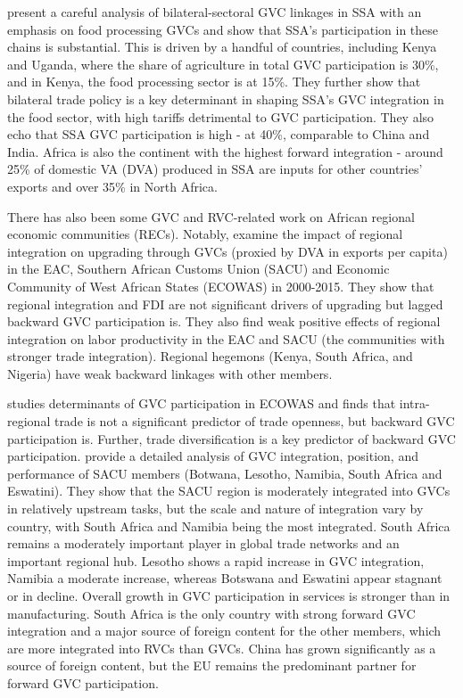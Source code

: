 \documentclass[a4paper]{article}
\begin{document}
\citet{balie2019does} present a careful analysis of bilateral-sectoral GVC linkages in SSA with an emphasis on food processing GVCs and show that SSA's participation in these chains is substantial. This is driven by a handful of countries, including Kenya and Uganda, where the share of agriculture in total GVC participation is 30\%, and in Kenya, the food processing sector is at 15\%. They further show that bilateral trade policy is a key determinant in shaping SSA's GVC integration in the food sector, with high tariffs detrimental to GVC participation. They also echo \citet{foster2015global} that SSA GVC participation is high - at 40\%, comparable to China and India. Africa is also the continent with the highest forward integration - around 25\% of domestic VA (DVA) produced in SSA are inputs for other countries' exports and over 35\% in North Africa. \newline

There has also been some GVC and RVC-related work on African regional economic communities (RECs). Notably, \citet{obasaju2021regional} examine the impact of regional integration on upgrading through GVCs (proxied by DVA in exports per capita) in the EAC, Southern African Customs Union (SACU) and Economic Community of West African States (ECOWAS) in 2000-2015. They show that regional integration and FDI are not significant drivers of upgrading but lagged backward GVC participation is. They also find weak positive effects of regional integration on labor productivity in the EAC and SACU (the communities with stronger trade integration). Regional hegemons (Kenya, South Africa, and Nigeria) have weak backward linkages with other members. \newline 

\citet{tinta2017determinants} studies determinants of GVC participation in ECOWAS and finds that intra-regional trade is not a significant predictor of trade openness, but backward GVC participation is. Further, trade diversification is a key predictor of backward GVC participation. \citet{engel2016sacu} provide a detailed analysis of GVC integration, position, and performance of SACU members (Botwana, Lesotho, Namibia, South Africa and Eswatini). They show that the SACU region is moderately integrated into GVCs in relatively upstream tasks, but the scale and nature of integration vary by country, with South Africa and Namibia being the most integrated. South Africa remains a moderately important player in global trade networks and an important regional hub. Lesotho shows a rapid increase in GVC integration, Namibia a moderate increase, whereas Botswana and Eswatini appear stagnant or in decline. Overall growth in GVC participation in services is stronger than in manufacturing. South Africa is the only country with strong forward GVC integration and a major source of foreign content for the other members, which are more integrated into RVCs than GVCs. China has grown significantly as a source of foreign content, but the EU remains the predominant partner for forward GVC participation. \newline 
\end{document}
